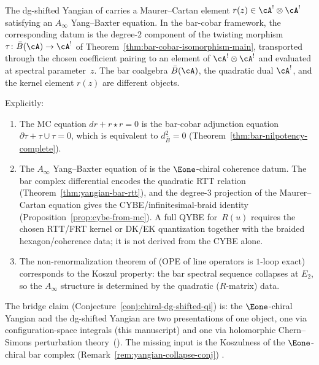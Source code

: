 \begin{remark}
\label{rem:dnp-mc-twisting}
The dg-shifted Yangian of \cite{DNP25} carries a
Maurer--Cartan element $r(z) \in \cA^! \otimes \cA^!$
satisfying an $A_\infty$ Yang--Baxter equation.
In the bar-cobar framework, the corresponding datum is the degree-$2$
component of the twisting morphism
$\tau\colon \bar{B}(\cA)\to \cA^!$ of
Theorem~\ref{thm:bar-cobar-isomorphism-main}, transported through the
chosen coefficient pairing to an element of
$\cA^!\otimes\cA^!$ and evaluated at spectral parameter~$z$.  The
bar coalgebra $\bar B(\cA)$, the quadratic dual $\cA^!$, and the
kernel element $r(z)$ are different objects.

Explicitly:
\begin{enumerate}[label=\textup{(\roman*)}]
\item The MC equation $dr + r \star r = 0$ is the
 bar-cobar adjunction equation
 $\partial \tau + \tau \cup \tau = 0$,
 which is equivalent to $d_{\bar{B}}^2 = 0$
 (Theorem~\ref{thm:bar-nilpotency-complete}).
\item The $A_\infty$ Yang--Baxter equation of
 \cite[\S5]{DNP25} is the $\Eone$-chiral coherence datum.
 The bar complex differential encodes the quadratic RTT relation
 (Theorem~\ref{thm:yangian-bar-rtt}), and the degree-$3$ projection of
 the Maurer--Cartan equation gives the CYBE/infinitesimal-braid
 identity
 (Proposition~\ref{prop:cybe-from-mc}). A full QYBE for~$R(u)$
 requires the chosen RTT/FRT kernel or DK/EK quantization together with
 the braided hexagon/coherence data; it is not derived from the CYBE
 alone.
\item The non-renormalization theorem of \cite[Thm.~4.1]{DNP25}
 (OPE of line operators is $1$-loop exact) corresponds to
 the Koszul property: the bar spectral sequence collapses
 at $E_2$, so the $A_\infty$ structure is determined by
 the quadratic ($R$-matrix) data.
\end{enumerate}

The bridge claim (Conjecture~\ref{conj:chiral-dg-shifted-qi}) is:
the $\Eone$-chiral Yangian and the dg-shifted Yangian are two
presentations of one object, one via configuration-space
integrals (this manuscript) and one via holomorphic
Chern--Simons perturbation theory~(\cite{DNP25}). The missing
input is the Koszulness of the $\Eone$-chiral bar complex
\ifannalsedition\else
(Remark~\ref{rem:yangian-collapse-conj})
\fi.
\end{remark}


